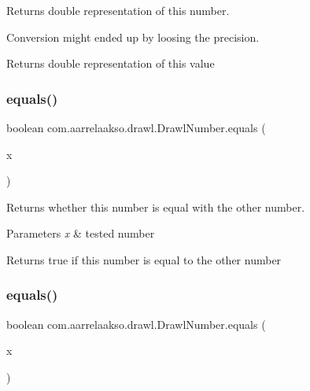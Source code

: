 Returns double representation of this number. 

Conversion might ended up by loosing the precision.

\begin{DoxyReturn}{Returns}
double representation of this value 
\end{DoxyReturn}
\mbox{\label{classcom_1_1aarrelaakso_1_1drawl_1_1_drawl_number_a0b7c86770556d17d8de1b59b01d70d4e}} 
\subsubsection{\texorpdfstring{equals()}{equals()}\hspace{0.1cm}{\footnotesize\ttfamily [1/3]}}
{\footnotesize\ttfamily boolean com.\+aarrelaakso.\+drawl.\+Drawl\+Number.\+equals (\begin{DoxyParamCaption}\item[{\hyperlink{classcom_1_1aarrelaakso_1_1drawl_1_1_drawl_number}{Drawl\+Number}}]{x }\end{DoxyParamCaption})\hspace{0.3cm}{\ttfamily [protected]}}



Returns whether this number is equal with the other number. 


\begin{DoxyParams}{Parameters}
{\em x} & tested number \\
\hline
\end{DoxyParams}
\begin{DoxyReturn}{Returns}
true if this number is equal to the other number 
\end{DoxyReturn}
\mbox{\label{classcom_1_1aarrelaakso_1_1drawl_1_1_drawl_number_acd9190a42d7771c2bfe88725c4469274}} 
\subsubsection{\texorpdfstring{equals()}{equals()}\hspace{0.1cm}{\footnotesize\ttfamily [2/3]}}
{\footnotesize\ttfamily boolean com.\+aarrelaakso.\+drawl.\+Drawl\+Number.\+equals (\begin{DoxyParamCaption}\item[{double}]{x }\end{DoxyParamCaption})\hspace{0.3cm}{\ttfamily [protected]}}



